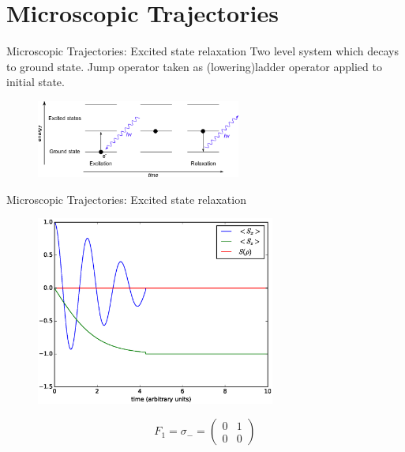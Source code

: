 \documentclass{beamer}
\begin{document}
\section{Microscopic Trajectories}
\begin{frame}{Microscopic Trajectories: Excited state relaxation}
	Two level system which decays to ground state.
	Jump operator taken as (lowering)ladder operator applied to initial state.
	\begin{figure}[h]
		\centering
		\includegraphics[width=0.6\textwidth]{figs/relaxation.png}
		\label{fig:digraph}
	\end{figure}
\end{frame}


\begin{frame}{Microscopic Trajectories: Excited state relaxation}
	
	\begin{figure}[!htb]
		\centering
		\includegraphics[width=0.7\textwidth]{figs/relaxation_1.eps}
	\end{figure}
		\begin{equation*}
		F_1 = \sigma_- =
		\begin{pmatrix}
		0 & 1 \\
		0 & 0 
		\end{pmatrix}
		\end{equation*}
\end{frame}
\end{document}
